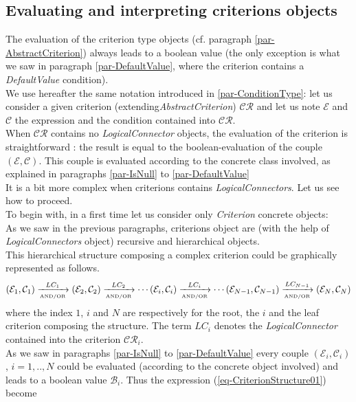 \documentclass[a4paper,11pt] {article}
\begin{document}
\subsection{Evaluating and interpreting criterions objects}\label{par-EvalCriterions}
The evaluation of the criterion type objects (cf. paragraph \ref{par-AbstractCriterion}) always leads to a boolean value
(the only exception is what we saw in paragraph \ref{par-DefaultValue}, where the criterion contains a {\it DefaultValue} condition).\\
We use hereafter the same notation introduced in \ref{par-ConditionType}: let us consider a given criterion (extending{\it AbstractCriterion}) $\mathcal{CR}$ and let us note $\mathcal E$ and
$\mathcal C$ the expression and the condition contained into $\mathcal{CR}$.\\
When $\mathcal{CR}$ contains no {\it LogicalConnector} objects, the evaluation of the criterion is straightforward : 
the result is equal to the boolean-evaluation of the couple $(\mathcal E, \mathcal C)$. This couple is evaluated according to the concrete class involved, as explained in paragraphs \ref{par-IsNull} to \ref{par-DefaultValue} \\
It is a bit more complex when criterions contains {\it LogicalConnectors}. Let us see how to proceed.\\
To begin with, in a first time let us consider only {\it Criterion} concrete objects:\\
As we saw in the previous paragraphs, criterions object are (with the help of {\it LogicalConnectors} object) recursive and hierarchical objects.\\
This hierarchical structure composing a complex criterion could be graphically represented as follows.
\begin{equation}\label{eq-CriterionStructure01}
(\mathcal E_1, \mathcal C_1) \xrightarrow[{\mbox{\tiny AND/OR}}]{LC_1} 
(\mathcal E_2, \mathcal C_2) \xrightarrow[{\mbox{\tiny AND/OR}}]{LC_2}
\cdots 
(\mathcal E_i, \mathcal C_i) \xrightarrow[{\mbox{\tiny AND/OR}}]{LC_i}
\cdots 
(\mathcal E_{N-1}, \mathcal C_{N-1}) \xrightarrow[{\mbox{\tiny AND/OR}}]{LC_{N-1}}
(\mathcal E_N, \mathcal C_N)
\end{equation}
where the index $1$, $i$ and $N$ are respectively for the root, the $i$ and the leaf criterion composing the structure. The term $LC_i$ denotes the {\it LogicalConnector} contained into the criterion $\mathcal{CR}_i$.\\
As we saw in paragraphs \ref{par-IsNull} to \ref{par-DefaultValue} every couple $(\mathcal E_i, \mathcal C_i)$, $i=1,..,N$ could be evaluated (according to the concrete object involved) and leads to a boolean value $\mathcal B_i$. Thus the expression (\ref{eq-CriterionStructure01}) become
\end{document}

